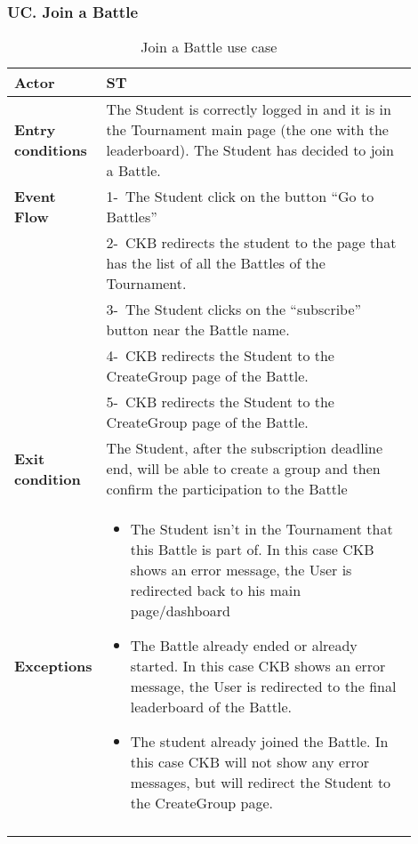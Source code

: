 \subsubsection*{UC\cuc . Join a Battle}
\begin{center}
    \begin{longtable}{|l|p{0.9\linewidth}|}
        \hline
        \textbf{Actor}            & ST                                                                                                                                                                                        \\
        \hline
        \textbf{Entry conditions} & The Student is correctly logged in and it is in the Tournament main page (the one with the leaderboard). The Student has decided to join a Battle.        \\
        \hline
        \textbf{Event Flow}       & 1-\ The Student click on the button “Go to Battles”        \\
        & 2-\ CKB redirects the student to the page that has the list of all the Battles of the Tournament.        \\
        & 3-\ The Student clicks on the “subscribe” button near the Battle name.        \\
        & 4-\ CKB redirects the Student to the CreateGroup page of the Battle.        \\
        & 5-\ CKB redirects the Student to the CreateGroup page of the Battle.        \\
        \hline
        \textbf{Exit condition}   & The Student, after the subscription deadline end, will be able to create a group and then confirm the participation to the Battle        \\
        \hline
        \textbf{Exceptions}        & \begin{itemize}
            \item The Student isn’t in the Tournament that this Battle is part of. In this case CKB shows an error message, the User is redirected back to his main page/dashboard
            \item The Battle already ended or already started. In this case  CKB shows an error message, the User is redirected to the final leaderboard of the Battle.
            \item The student already joined the Battle. In this case CKB will not show any error messages, but will redirect the Student to the CreateGroup page.
         \end{itemize}    \\
        \hline
        \caption{Join a Battle use case}
        \label{tab: join_a_Battle_use_case}
    \end{longtable}
\end{center}

